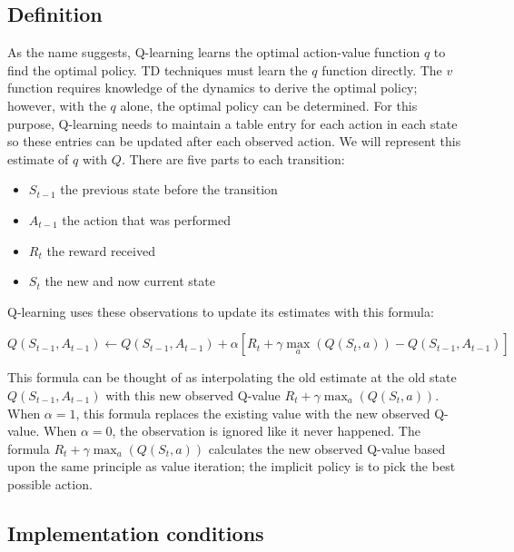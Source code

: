 \documentclass[]{final_report}
\begin{document}
\subsection{Definition}

As the name suggests, Q-learning learns the optimal action-value function $q$ to find the optimal policy. TD techniques must learn the $q$ function directly. The $v$ function requires knowledge of the dynamics to derive the optimal policy; however, with the $q$ alone, the optimal policy can be determined. For this purpose, Q-learning needs to maintain a table entry for each action in each state so these entries can be updated after each observed action. We will represent this estimate of $q$ with $Q$. There are five parts to each transition: 
\begin{itemize}
  \item $S_{t-1}$ the previous state before the transition
  \item $A_{t-1}$ the action that was performed
  \item $R_t$ the reward received
  \item $S_t$ the new and now current state
\end{itemize}

Q-learning uses these observations to update its estimates with this formula:

\begin{equation}
  Q(S_{t-1}, A_{t-1}) \leftarrow Q(S_{t-1}, A_{t-1}) +  \alpha [R_t + \gamma \max_a(Q(S_t,a)) - Q(S_{t-1}, A_{t-1})]
  \label{eqn:q-learning-update-formula}
\end{equation}


This formula can be thought of as interpolating the old estimate at the old state $Q(S_{t-1}, A_{t-1})$ with this new observed Q-value $R_t + \gamma \max_a(Q(S_t, a))$. When $\alpha = 1$, this formula replaces the existing value with the new observed Q-value.  When $\alpha = 0$, the observation is ignored like it never happened. The formula $R_t + \gamma \max_a(Q(S_t, a))$ calculates the new observed Q-value based upon the same principle as value iteration; the implicit policy is to pick the best possible action. 

\subsection{Implementation conditions}
\end{document}
